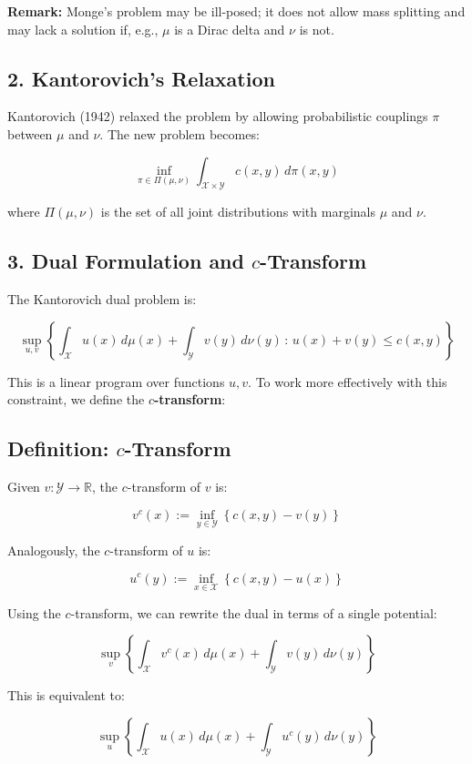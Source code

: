 \documentclass[11pt]{article}
\begin{document}
\textbf{Remark:} Monge’s problem may be ill-posed; it does not allow mass splitting and may lack a solution if, e.g., \(\mu\) is a Dirac delta and \(\nu\) is not.

\subsection*{2. Kantorovich’s Relaxation}

Kantorovich (1942) relaxed the problem by allowing probabilistic couplings \(\pi\) between \(\mu\) and \(\nu\). The new problem becomes:

\[
\inf_{\pi \in \Pi(\mu, \nu)} \int_{\mathcal{X} \times \mathcal{Y}} c(x, y) \, d\pi(x, y)
\]

where \(\Pi(\mu, \nu)\) is the set of all joint distributions with marginals \(\mu\) and \(\nu\).

\subsection*{3. Dual Formulation and $c$-Transform}

The Kantorovich dual problem is:

\[
\sup_{u, v} \left\{ \int_{\mathcal{X}} u(x) \, d\mu(x) + \int_{\mathcal{Y}} v(y) \, d\nu(y) \,:\, u(x) + v(y) \leq c(x, y) \right\}
\]

This is a linear program over functions \(u, v\). To work more effectively with this constraint, we define the \textbf{\(c\)-transform}:

\subsection*{Definition: \(c\)-Transform}

Given \(v : \mathcal{Y} \to \mathbb{R}\), the \(c\)-transform of \(v\) is:

\[
v^c(x) := \inf_{y \in \mathcal{Y}} \left\{ c(x, y) - v(y) \right\}
\]

Analogously, the \(c\)-transform of \(u\) is:

\[
u^c(y) := \inf_{x \in \mathcal{X}} \left\{ c(x, y) - u(x) \right\}
\]

Using the \(c\)-transform, we can rewrite the dual in terms of a single potential:

\[
\sup_v \left\{ \int_{\mathcal{X}} v^c(x) \, d\mu(x) + \int_{\mathcal{Y}} v(y) \, d\nu(y) \right\}
\]

This is equivalent to:

\[
\sup_u \left\{ \int_{\mathcal{X}} u(x) \, d\mu(x) + \int_{\mathcal{Y}} u^c(y) \, d\nu(y) \right\}
\]
\end{document}
